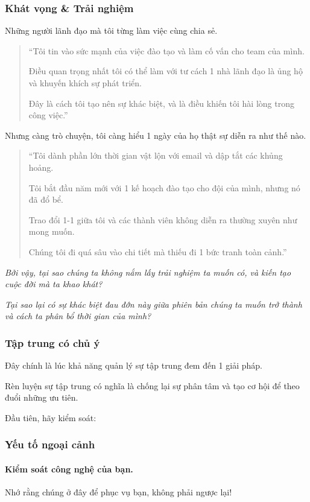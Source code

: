 \documentclass{article}
\begin{document}
\subsubsection{Khát vọng \& Trải nghiệm}
Những người lãnh đạo mà tôi từng làm việc cùng chia sẻ.
\begin{quotation}
	``Tôi tin vào sức mạnh của việc đào tạo và làm cố vấn cho team của mình.
	
	Điều quan trọng nhất tôi có thể làm với tư cách 1 nhà lãnh đạo là ủng hộ và khuyến khích sự phát triển.
	
	Đây là cách tôi tạo nên sự khác biệt, và là điều khiến tôi hài lòng trong công việc.''
\end{quotation}
Nhưng càng trò chuyện, tôi càng hiểu 1 ngày của họ thật sự diễn ra như thế nào.
\begin{quotation}
	``Tôi dành phần lớn thời gian vật lộn với email và dập tắt các khủng hoảng.
	
	Tôi bắt đầu năm mới với 1 kế hoạch đào tạo cho đội của mình, nhưng nó đã đổ bể.
	
	Trao đổi 1-1 giữa tôi và các thành viên không diễn ra thường xuyên như mong muốn.
	
	Chúng tôi đi quá sâu vào chi tiết mà thiếu đi 1 bức tranh toàn cảnh.''
\end{quotation}
\textit{Bởi vậy, tại sao chúng ta không nắm lấy trải nghiệm ta muốn có, và kiến tạo cuộc đời mà ta khao khát?}

\textit{Tại sao lại có sự khác biệt đau đớn này giữa phiên bản chúng ta muốn trở thành và cách ta phân bổ thời gian của mình?}

\subsubsection{Tập trung có chủ ý}
Đây chính là lúc khả năng quản lý sự tập trung đem đến 1 giải pháp.

Rèn luyện sự tập trung có nghĩa là chống lại sự phân tâm và tạo cơ hội để theo đuổi những ưu tiên.

Đầu tiên, hãy kiểm soát:

\subsubsection{Yếu tố ngoại cảnh}

\paragraph{Kiểm soát công nghệ của bạn.} Nhớ rằng chúng ở đây để phục vụ bạn, không phải ngược lại!
\end{document}

